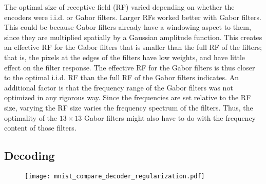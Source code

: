 The optimal size of receptive field (RF) varied depending on whether the
encoders were i.i.d. or Gabor filters.
Larger RFs worked better with Gabor filters.
This could be because Gabor filters already have a windowing aspect to them,
since they are multiplied spatially by a Gaussian amplitude function.
This creates an effective RF for the Gabor filters that is
smaller than the full RF of the filters;
that is, the pixels at the edges of the filters have low weights,
and have little effect on the filter response.
The effective RF for the Gabor filters is thus closer
to the optimal i.i.d. RF
than the full RF of the Gabor filters indicates.
An additional factor is that the frequency range of the Gabor filters
was not optimized in any rigorous way.
Since the frequencies are set relative to the RF size,
varying the RF size varies the frequency spectrum of the filters.
Thus, the optimality of the $13 \times 13$ Gabor filters
might also have to do with the frequency content of those filters.



\subsection{Decoding}

\begin{figure}
  \centering
  \texttt{[image: mnist\_compare\_decoder\_regularization.pdf]}
\end{figure}

